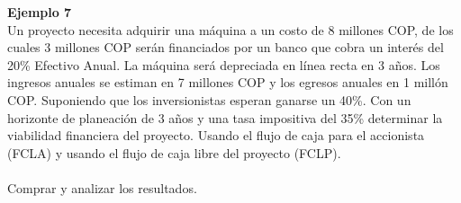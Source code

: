 \textbf{Ejemplo 7}\\
Un proyecto necesita adquirir una máquina a un costo de 8 millones COP, de los cuales 3 millones COP serán financiados por un banco que cobra un interés del 20\% Efectivo Anual. La máquina será depreciada en línea recta en 3 años. Los ingresos anuales se estiman en 7 millones COP y los egresos anuales en 1 millón COP. Suponiendo que los inversionistas esperan ganarse un 40\%. Con un horizonte de planeación de 3 años y una tasa impositiva del 35\% determinar la viabilidad financiera del proyecto. Usando el flujo de caja para el accionista (FCLA) y usando el flujo de caja libre del proyecto (FCLP).\\\\
Comprar y analizar los resultados.



